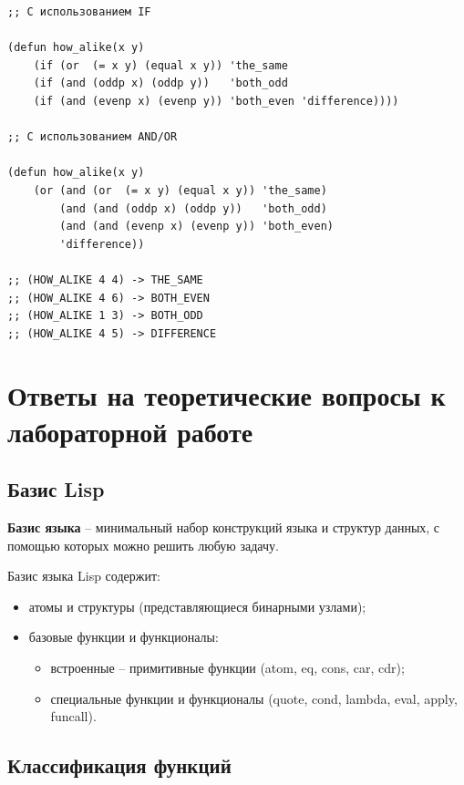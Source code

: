 \documentclass[a4paper,14pt, unknownkeysallowed]{extreport}
\begin{document}
\begin{center}
\captionsetup{justification=raggedright,singlelinecheck=off}
\begin{lstlisting}[label=lst:parallel_processing,caption=Решение задания 9]
;; С использованием IF

(defun how_alike(x y)
	(if (or  (= x y) (equal x y)) 'the_same 
	(if (and (oddp x) (oddp y))   'both_odd 
	(if (and (evenp x) (evenp y)) 'both_even 'difference))))

;; С использованием AND/OR

(defun how_alike(x y)
	(or (and (or  (= x y) (equal x y)) 'the_same)
		(and (and (oddp x) (oddp y))   'both_odd)
		(and (and (evenp x) (evenp y)) 'both_even)
		'difference))

;; (HOW_ALIKE 4 4) -> THE_SAME
;; (HOW_ALIKE 4 6) -> BOTH_EVEN
;; (HOW_ALIKE 1 3) -> BOTH_ODD
;; (HOW_ALIKE 4 5) -> DIFFERENCE	
\end{lstlisting}
\end{center}


\chapter{Ответы на теоретические вопросы к лабораторной работе}

\section{Базис Lisp}

\textbf{Базис языка} -- минимальный набор конструкций языка и структур данных, с помощью которых можно решить любую задачу.

Базис языка Lisp содержит:

\begin{itemize}
	\item атомы и структуры (представляющиеся бинарными узлами);
	\item базовые функции и функционалы:
	\begin{itemize}
		\item встроенные -- примитивные функции (atom, eq, cons, car, cdr);
		\item специальные функции и функционалы (quote, cond, lambda, eval, apply, funcall).
	\end{itemize}
\end{itemize}

\section{Классификация функций}
\end{document}
